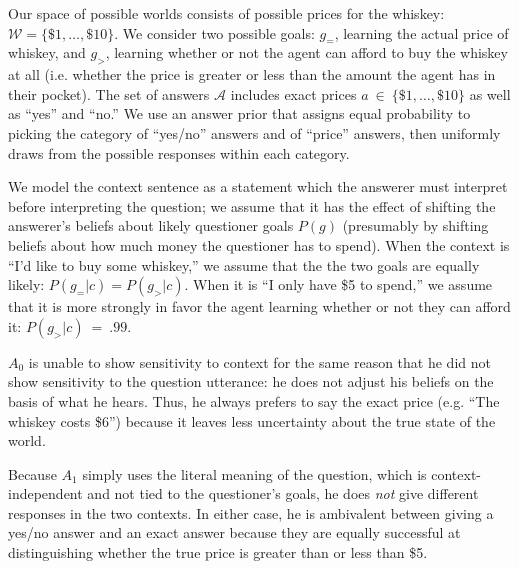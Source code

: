 \documentclass[12pt, floatsintext, jou]{apa6}
\begin{document}
Our space of possible worlds consists of possible prices for the whiskey: $\mathcal{W} = \{\$1, \dots, \$10\}$. We consider two possible goals: $g_=$, learning the actual price of whiskey,  and $g_>$, learning whether or not the agent can afford to buy the whiskey at all (i.e. whether the price is greater or less than the amount the agent has in their pocket). The set of answers $\mathcal{A}$ includes exact prices $a~\in~\{\$1, \dots, \$10\}$ as well as ``yes'' and ``no.'' We use an answer prior that assigns equal probability to picking the category of ``yes/no'' answers and of ``price'' answers, then uniformly draws from the possible responses within each category. 


We model the context sentence as a statement which the answerer must interpret before interpreting the question; we assume that it has the effect of shifting the answerer's beliefs about likely questioner goals $P(g)$ (presumably by shifting beliefs about how much money the questioner has to spend). When the context is ``I'd like to buy some whiskey,'' we assume that the the two goals are equally likely: $P(g_= | c) = P(g_> | c)$. When it is ``I only have \$5 to spend,'' we assume that it is more strongly in favor the agent learning whether or not they can afford it: $P(g_> | c)~=~.99$. 

$A_0$ is unable to show sensitivity to context for the same reason that he did not show sensitivity to the question utterance: he does not adjust his beliefs on the basis of what he hears. Thus, he always prefers to say the exact price (e.g. ``The whiskey costs \$6'') because it leaves less uncertainty about the true state of the world.

Because $A_1$ simply uses the literal meaning of the question, which is context-independent and not tied to the questioner's goals, he does \emph{not} give different responses in the two contexts. In either case, he is ambivalent between giving a yes/no answer and an exact answer because they are equally successful at distinguishing whether the true price is greater than or less than \$5. 
\end{document}
